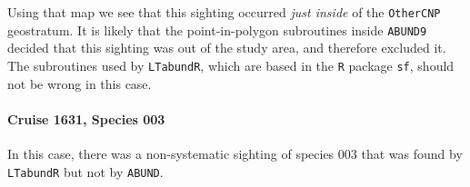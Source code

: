 \documentclass[
]{book}
\begin{document}
Using that map we see that this sighting occurred \emph{just inside} of the \texttt{OtherCNP} geostratum. It is likely that the point-in-polygon subroutines inside \texttt{ABUND9} decided that this sighting was out of the study area, and therefore excluded it. The subroutines used by \texttt{LTabundR}, which are based in the \texttt{R} package \texttt{sf}, should not be wrong in this case.

\hypertarget{cruise-1631-species-003}{%
\paragraph{Cruise 1631, Species 003}\label{cruise-1631-species-003}}

In this case, there was a non-systematic sighting of species 003 that was found by \texttt{LTabundR} but not by \texttt{ABUND}.
\end{document}
